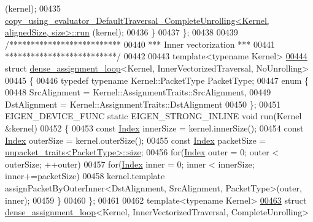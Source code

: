 \begin{DoxyCode}
      (kernel);
00435     
      \hyperlink{struct_eigen_1_1internal_1_1copy__using__evaluator___default_traversal___complete_unrolling}{copy\_using\_evaluator\_DefaultTraversal\_CompleteUnrolling<Kernel, alignedSize, size>::run}
      (kernel);
00436   \}
00437 \};
00438 
00439 \textcolor{comment}{/**************************}
00440 \textcolor{comment}{*** Inner vectorization ***}
00441 \textcolor{comment}{**************************/}
00442 
00443 \textcolor{keyword}{template}<\textcolor{keyword}{typename} Kernel>
\hyperlink{struct_eigen_1_1internal_1_1dense__assignment__loop_3_01_kernel_00_01_inner_vectorized_traversal_00_01_no_unrolling_01_4}{00444} \textcolor{keyword}{struct }\hyperlink{struct_eigen_1_1internal_1_1dense__assignment__loop}{dense\_assignment\_loop}<Kernel, InnerVectorizedTraversal, NoUnrolling>
00445 \{
00446   \textcolor{keyword}{typedef} \textcolor{keyword}{typename} Kernel::PacketType PacketType;
00447   \textcolor{keyword}{enum} \{
00448     SrcAlignment = Kernel::AssignmentTraits::SrcAlignment,
00449     DstAlignment = Kernel::AssignmentTraits::DstAlignment
00450   \};
00451   EIGEN\_DEVICE\_FUNC \textcolor{keyword}{static} EIGEN\_STRONG\_INLINE \textcolor{keywordtype}{void} run(Kernel &kernel)
00452   \{
00453     \textcolor{keyword}{const} \hyperlink{namespace_eigen_a62e77e0933482dafde8fe197d9a2cfde}{Index} innerSize = kernel.innerSize();
00454     \textcolor{keyword}{const} \hyperlink{namespace_eigen_a62e77e0933482dafde8fe197d9a2cfde}{Index} outerSize = kernel.outerSize();
00455     \textcolor{keyword}{const} \hyperlink{namespace_eigen_a62e77e0933482dafde8fe197d9a2cfde}{Index} packetSize = \hyperlink{struct_eigen_1_1internal_1_1unpacket__traits}{unpacket\_traits<PacketType>::size};
00456     \textcolor{keywordflow}{for}(\hyperlink{namespace_eigen_a62e77e0933482dafde8fe197d9a2cfde}{Index} outer = 0; outer < outerSize; ++outer)
00457       \textcolor{keywordflow}{for}(\hyperlink{namespace_eigen_a62e77e0933482dafde8fe197d9a2cfde}{Index} inner = 0; inner < innerSize; inner+=packetSize)
00458         kernel.template assignPacketByOuterInner<DstAlignment, SrcAlignment, PacketType>(outer, inner);
00459   \}
00460 \};
00461 
00462 \textcolor{keyword}{template}<\textcolor{keyword}{typename} Kernel>
\hyperlink{struct_eigen_1_1internal_1_1dense__assignment__loop_3_01_kernel_00_01_inner_vectorized_traversal_00_01_complete_unrolling_01_4}{00463} \textcolor{keyword}{struct }\hyperlink{struct_eigen_1_1internal_1_1dense__assignment__loop}{dense\_assignment\_loop}<Kernel, InnerVectorizedTraversal, CompleteUnrolling>

\end{DoxyCode}
